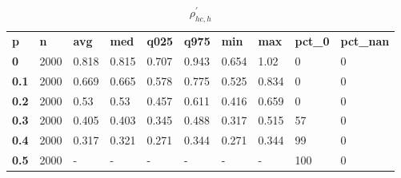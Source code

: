 \begin{table}[h]
 \centering 
\footnotesize
\caption{$\rho_{hc,h}^\prime $}
\label{tab:alphahch}
\begin{tabular}[h]{| l l l l l l l l l l|
    } \hline
\textbf{ p} & \textbf{ n} & \textbf{ avg} & \textbf{ med} & \textbf{ q025} & \textbf{ q975} & \textbf{ min} & \textbf{ max} & \textbf{ pct\_0} & \textbf{ pct\_nan}
           \\
  \textbf{  0} & 2000 & 0.818 & 0.815 & 0.707 & 0.943 & 0.654 &  1.02 &   0 & 0
           \\
  \textbf{0.1} & 2000 & 0.669 & 0.665 & 0.578 & 0.775 & 0.525 & 0.834 &   0 & 0
           \\
  \textbf{0.2} & 2000 &  0.53 &  0.53 & 0.457 & 0.611 & 0.416 & 0.659 &   0 & 0
           \\
  \textbf{0.3} & 2000 & 0.405 & 0.403 & 0.345 & 0.488 & 0.317 & 0.515 &  57 & 0
           \\
  \textbf{0.4} & 2000 & 0.317 & 0.321 & 0.271 & 0.344 & 0.271 & 0.344 &  99 & 0
           \\
  \textbf{0.5} & 2000 & - & - & - & - & - & - & 100 & 0
           \\
 \hline \end{tabular}
 \end{table}
